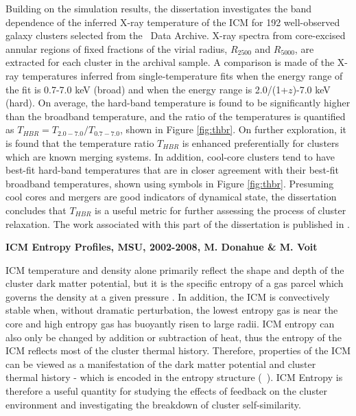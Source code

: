 \documentclass[12pt]{cv}
\begin{document}
Building on the \cite{me01} simulation results, the dissertation
investigates the band dependence of the inferred X-ray temperature of
the ICM for 192 well-observed galaxy clusters selected from the
\chandra\ Data Archive. X-ray spectra from core-excised annular
regions of fixed fractions of the virial radius, $R_{2500}$ and
$R_{5000}$, are extracted for each cluster in the archival sample. A
comparison is made of the X-ray temperatures inferred from
single-temperature fits when the energy range of the fit is 0.7-7.0
keV (broad) and when the energy range is 2.0/(1+$z$)-7.0 keV
(hard). On average, the hard-band temperature is found to be
significantly higher than the broadband temperature, and the ratio of
the temperatures is quantified as $T_{HBR} = T_{2.0-7.0}/T_{0.7-7.0}$,
shown in Figure \ref{fig:thbr}. On further exploration, it is found
that the temperature ratio $T_{HBR}$ is enhanced preferentially for
clusters which are known merging systems. In addition, cool-core
clusters tend to have best-fit hard-band temperatures that are in
closer agreement with their best-fit broadband temperatures, shown
using symbols in Figure \ref{fig:thbr}. Presuming cool cores and
mergers are good indicators of dynamical state, the dissertation
concludes that $T_{HBR}$ is a useful metric for further assessing the
process of cluster relaxation. The work associated with this part of
the dissertation is published in \cite{xrayband}.

{\bfseries{ICM Entropy Profiles, MSU, 2002-2008, M. Donahue \& M. Voit}}

ICM temperature and density alone primarily reflect the shape and
depth of the cluster dark matter potential, but it is the specific
entropy of a gas parcel which governs the density at a given pressure
\cite{voitbryan}. In addition, the ICM is convectively stable when,
without dramatic perturbation, the lowest entropy gas is near the core
and high entropy gas has buoyantly risen to large radii. ICM entropy
can also only be changed by addition or subtraction of heat, thus the
entropy of the ICM reflects most of the cluster thermal
history. Therefore, properties of the ICM can be viewed as a
manifestation of the dark matter potential and cluster thermal history
- which is encoded in the entropy structure
(\eg\ \cite{voitbryan}). ICM Entropy is therefore a useful quantity
for studying the effects of feedback on the cluster environment and
investigating the breakdown of cluster self-similarity.
\end{document}
